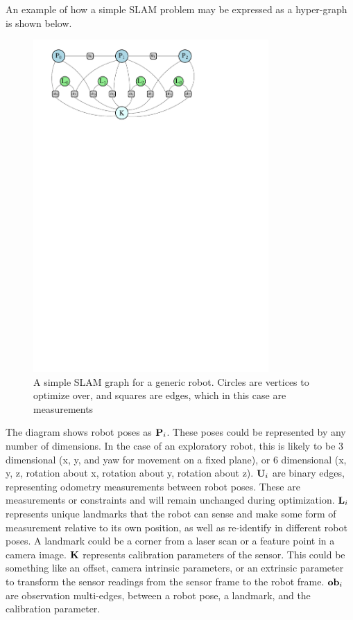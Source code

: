 An example of how a simple SLAM problem may be expressed as a hyper-graph is shown below.
\begin{figure}[h]
  \centering
      \includegraphics[width=0.8\textwidth]{chapters/images/simple_graph}
  \caption{A simple SLAM graph for a generic robot.  Circles are vertices to optimize over, and
squares are edges, which in this case are measurements}
\end{figure}

The diagram shows robot poses as $\mathbf P_i$.  These poses could be represented by any number of dimensions. In the case of an exploratory robot, this is likely to be 3 dimensional (x, y, and yaw for movement on a fixed plane), or 6 dimensional (x, y, z, rotation about x, rotation about y, rotation about z).  $\mathbf U_i$ are binary edges, representing odometry measurements between robot poses. These are measurements or constraints and will remain unchanged during optimization.  
$\mathbf L_i$ represents unique landmarks that the robot can sense and make some form of measurement relative to its own position, as well as re-identify in different robot poses.  A landmark could be a corner from a laser scan or a feature point in a camera image.  $\mathbf K$ represents calibration parameters of the sensor.  This could be something like an offset, camera intrinsic parameters, or an extrinsic parameter to transform the sensor readings from the sensor frame to the robot frame.  $\mathbf {ob}_i$ are observation multi-edges, between a robot pose, a landmark, and the calibration parameter.

